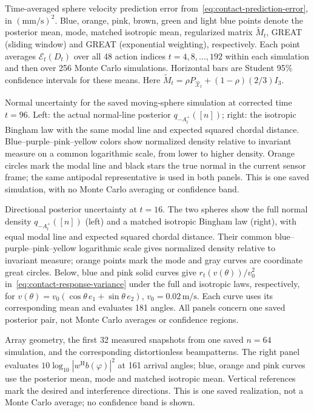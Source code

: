 \caption{Time-averaged sphere velocity prediction error from~\eqref{eq:contact-prediction-error}, in $(\mathrm{mm}/\mathrm{s})^2$. Blue, orange, pink, brown, green and light blue points denote the posterior mean, mode, matched isotropic mean, regularized matrix $\widetilde M_t$, GREAT (sliding window) and GREAT (exponential weighting), respectively. Each point averages $\mathcal E_t(D_t)$ over all 48 action indices $t=4,8,\ldots,192$ within each simulation and then over 256 Monte Carlo simulations. Horizontal bars are Student 95\% confidence intervals for these means. Here $\widetilde M_t=\rho P_{\widehat{\mathcal X}_t}+(1-\rho)(2/3)I_3$.}

\caption{Normal uncertainty for the saved moving-sphere simulation at corrected time $t=96$. Left: the actual normal-line posterior $q_{-A_t^+}([n])$; right: the isotropic Bingham law with the same modal line and expected squared chordal distance. Blue--purple--pink--yellow colors show normalized density relative to invariant measure on a common logarithmic scale, from lower to higher density. Orange circles mark the modal line and black stars the true normal in the current sensor frame; the same antipodal representative is used in both panels. This is one saved simulation, with no Monte Carlo averaging or confidence band.}

\caption{Directional posterior uncertainty at $t=16$. The two spheres show the full normal density $q_{-A_t^+}([n])$ (left) and a matched isotropic Bingham law (right), with equal modal line and expected squared chordal distance. Their common blue--purple--pink--yellow logarithmic scale gives normalized density relative to invariant measure; orange points mark the mode and gray curves are coordinate great circles. Below, blue and pink solid curves give $r_t(v(\theta))/v_0^2$ in~\eqref{eq:contact-response-variance} under the full and isotropic laws, respectively, for $v(\theta)=v_0(\cos\theta\,e_1+\sin\theta\,e_2)$, $v_0=0.02\,\mathrm{m/s}$. Each curve uses its corresponding mean and evaluates 181 angles. All panels concern one saved posterior pair, not Monte Carlo averages or confidence regions.}


\caption{Array geometry, the first 32 measured snapshots from one saved $n=64$ simulation, and the corresponding distortionless beampatterns. The right panel evaluates $10\log_{10}|w^{\mathrm H}b(\varphi)|^2$ at 161 arrival angles; blue, orange and pink curves use the posterior mean, mode and matched isotropic mean. Vertical references mark the desired and interference directions. This is one saved realization, not a Monte Carlo average; no confidence band is shown.}

